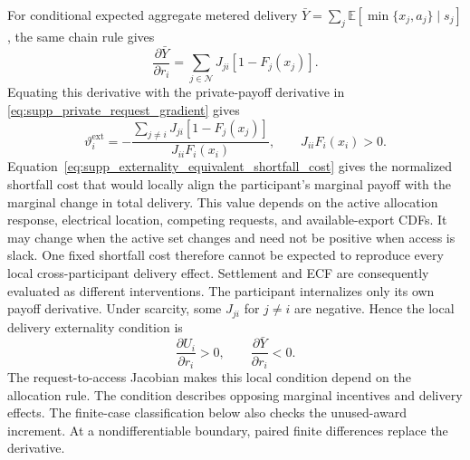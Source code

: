 \documentclass[11pt]{article}
\begin{document}
For conditional expected aggregate metered delivery
$\bar Y=\sum_j\mathbb E[\min\{x_j,a_j\}\mid s_j]$, the same chain rule gives
\begin{equation}
\frac{\partial\bar Y}{\partial r_i}
=\sum_{j\in\mathcal N}J_{ji}[1-F_j(x_j)].
\label{eq:supp_feeder_request_gradient}
\end{equation}
Equating this derivative with the private-payoff derivative in
\eqref{eq:supp_private_request_gradient} gives
\begin{equation}
\vartheta_i^{\mathrm{ext}}
=-\frac{\sum_{j\ne i}J_{ji}[1-F_j(x_j)]}
{J_{ii}F_i(x_i)},
\qquad J_{ii}F_i(x_i)>0.
\label{eq:supp_externality_equivalent_shortfall_cost}
\end{equation}
Equation~\eqref{eq:supp_externality_equivalent_shortfall_cost} gives the
normalized shortfall cost that would locally align the participant's marginal
payoff with the marginal change in total delivery. This value depends on the
active allocation response, electrical location, competing requests, and
available-export CDFs. It may change when the active set changes and need not be
positive when access is slack. One fixed shortfall cost therefore cannot be
expected to reproduce every local cross-participant delivery effect. Settlement
and ECF are consequently evaluated as different interventions.
The participant internalizes only its own payoff derivative. Under scarcity,
some $J_{ji}$ for $j\ne i$ are negative. Hence the local delivery externality
condition is
\begin{equation}
\frac{\partial U_i}{\partial r_i}>0,
\qquad
\frac{\partial\bar Y}{\partial r_i}<0.
\label{eq:supp_delivery_externality_condition}
\end{equation}
The request-to-access Jacobian makes this local condition depend on the
allocation rule. The condition describes opposing marginal incentives and
delivery effects. The finite-case classification below also checks the
unused-award increment. At a nondifferentiable boundary, paired finite
differences replace the derivative.
\end{document}
